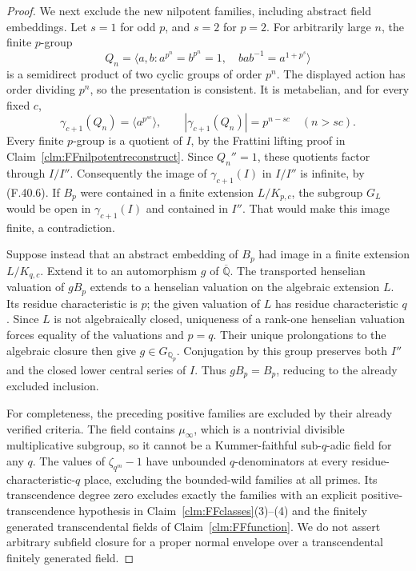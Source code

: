 \documentclass[11pt]{article}
\begin{document}
\begin{proof}
We next exclude the new nilpotent
families, including abstract field
embeddings. Let \(s=1\) for
odd \(p\), and \(s=2\) for
\(p=2\). For arbitrarily large
\(n\), the finite \(p\)-group
\[
 Q_n=\langle a,b:
       a^{p^n}=b^{p^n}=1,\quad
       bab^{-1}=a^{1+p^s}\rangle
                                                        \tag{F.40.5}
\]
is a semidirect product of two
cyclic groups of order \(p^n\).
The displayed action has order
dividing \(p^n\), so the
presentation is consistent.
It is metabelian, and for every
fixed \(c\),
\[
           \gamma_{c+1}(Q_n)
                  =\langle a^{p^{sc}}\rangle,
            \qquad
           |\gamma_{c+1}(Q_n)|=p^{n-sc}
                   \quad(n>sc).
                                                        \tag{F.40.6}
\]
Every finite \(p\)-group is a
quotient of \(I\), by the
Frattini lifting proof in
Claim~\ref{clm:FFnilpotentreconstruct}.
Since \(Q_n''=1\), these quotients
factor through \(I/I''\).
Consequently the image of
\(\gamma_{c+1}(I)\) in
\(I/I''\) is infinite, by
(F.40.6).
If \(B_p\) were contained in
a finite extension \(L/K_{p,c}\),
the subgroup \(G_L\) would be
open in \(\gamma_{c+1}(I)\)
and contained in \(I''\).
That would make this image
finite, a contradiction.

Suppose instead that an abstract
embedding of \(B_p\) had image
in a finite extension \(L/K_{q,c}\).
Extend it to an automorphism
\(g\) of \(\overline{\mathbb Q}\).
The transported henselian valuation
of \(gB_p\) extends to a henselian
valuation on the algebraic extension
\(L\). Its residue characteristic
is \(p\); the given valuation
of \(L\) has residue characteristic
\(q\). Since \(L\) is not
algebraically closed, uniqueness
of a rank-one henselian valuation
forces equality of the valuations
and \(p=q\). Their unique
prolongations to the algebraic
closure then give \(g\in G_{\mathbb Q_p}\).
Conjugation by this group preserves
both \(I''\) and the closed
lower central series of \(I\).
Thus \(gB_p=B_p\), reducing to
the already excluded inclusion.

For completeness, the preceding
positive families are excluded
by their already verified criteria.
The field contains \(\mu_\infty\),
which is a nontrivial divisible
multiplicative subgroup, so it
cannot be a Kummer-faithful
sub-\(q\)-adic field for any
\(q\). The values of
\(\zeta_{q^m}-1\) have unbounded
\(q\)-denominators at every
residue-characteristic-\(q\)
place, excluding the bounded-wild
families at all primes.
Its transcendence degree zero
excludes exactly the families with an explicit
positive-transcendence hypothesis in
Claim~\ref{clm:FFclasses}(3)--(4) and the
finitely generated transcendental fields
of Claim~\ref{clm:FFfunction}.
We do not assert arbitrary subfield
closure for a proper normal envelope
over a transcendental finitely generated field.


\end{proof}
\end{document}
